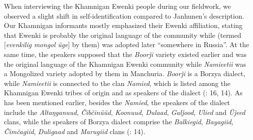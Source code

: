 \documentclass[output=paper,colorlinks,citecolor=brown]{langscibook}
\begin{document}
When interviewing the Khamnigan Ewenki people during our fieldwork, we observed a slight shift in self-identification compared to Janhunen’s description. Our Khamnigan informants mostly emphasized their Ewenki affiliation, stating that Ewenki is probably the original language of the community while  (termed [\textit{evenkilig mongol üge}] by them) was adopted later “somewhere in Russia”.  At the same time, the speakers supposed that the \textit{Boorǰi} variety existed earlier and was the original language of the Khamnigan Ewenki community while \textit{Namieetii} was a Mongolized variety adopted by them in Manchuria. \textit{Boorǰi} is a Borzya dialect, while \textit{Namieetii} is connected to the clan \textit{Namied}, which is listed among the Khamnigan Ewenki tribes of  origin and as speakers of the  dialect (\citealt{Janhunen1991}: 16, 14). As has been mentioned earlier, besides the \textit{Namied}, the speakers of the  dialect include the \textit{Altaŋganuud}, \textit{Čibčinüüd}, \textit{Koonuud}, \textit{Dulaad}, \textit{Galǰood}, \textit{Ulied} and \textit{Üǰeed} clans, while the speakers of Borzya dialect comprise the \textit{Balkiegid}, \textit{Bayagiid}, \textit{Čimčagiid}, \textit{Duligaad} and \textit{Marugiid} clans (\citealt{Janhunen1991}: 14).
\end{document}
